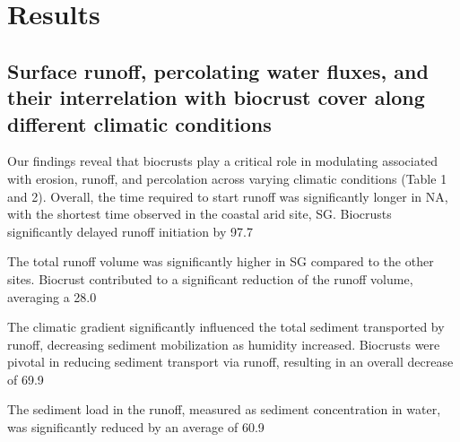 \section{Results}
\subsection{Surface runoff, percolating water fluxes, and their interrelation with biocrust cover along different climatic conditions}

Our findings reveal that biocrusts play a critical role in modulating associated with erosion, runoff, and percolation across varying climatic conditions (Table 1 and 2). Overall, the time required to start runoff was significantly longer in NA, with the shortest time observed in the coastal arid site, SG. Biocrusts significantly delayed runoff initiation by 97.7%

The total runoff volume was significantly higher in SG compared to the other sites. Biocrust contributed to a significant reduction of the runoff volume, averaging a 28.0%

The climatic gradient significantly influenced the total sediment transported by runoff, decreasing sediment mobilization as humidity increased. Biocrusts were pivotal in reducing sediment transport via runoff, resulting in an overall decrease of 69.9%

The sediment load in the runoff, measured as sediment concentration in water, was significantly reduced by an average of 60.9%
